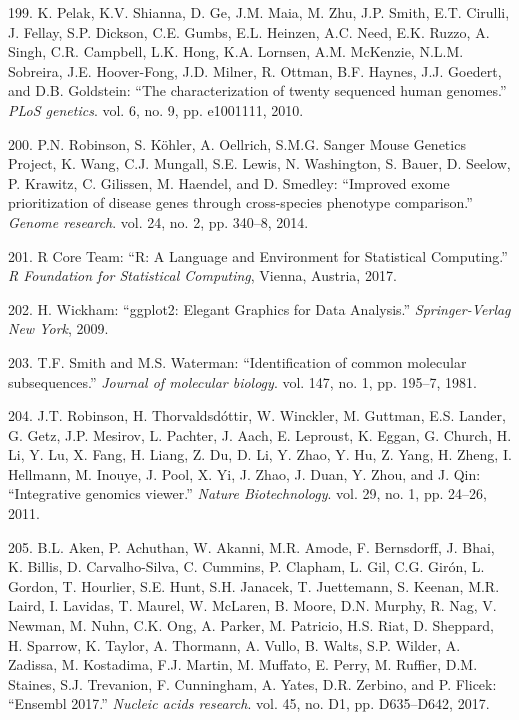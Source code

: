 \documentclass[12pt,a4paper,twoside]{ugathesis}
\theoremstyle{definition}
\theoremstyle{definition}
\theoremstyle{definition}
\theoremstyle{remark}
\begin{document}
\hypertarget{ref-Pelak2010}{}
199. K. Pelak, K.V. Shianna, D. Ge, J.M. Maia, M. Zhu, J.P. Smith, E.T.
Cirulli, J. Fellay, S.P. Dickson, C.E. Gumbs, E.L. Heinzen, A.C. Need,
E.K. Ruzzo, A. Singh, C.R. Campbell, L.K. Hong, K.A. Lornsen, A.M.
McKenzie, N.L.M. Sobreira, J.E. Hoover-Fong, J.D. Milner, R. Ottman,
B.F. Haynes, J.J. Goedert, and D.B. Goldstein: ``The characterization of
twenty sequenced human genomes.'' \emph{PLoS genetics}. vol. 6, no. 9,
pp. e1001111, 2010.

\hypertarget{ref-Robinson2014}{}
200. P.N. Robinson, S. Köhler, A. Oellrich, S.M.G. Sanger Mouse Genetics
Project, K. Wang, C.J. Mungall, S.E. Lewis, N. Washington, S. Bauer, D.
Seelow, P. Krawitz, C. Gilissen, M. Haendel, and D. Smedley: ``Improved
exome prioritization of disease genes through cross-species phenotype
comparison.'' \emph{Genome research}. vol. 24, no. 2, pp. 340--8, 2014.

\hypertarget{ref-RCoreTeam2017}{}
201. R Core Team: ``R: A Language and Environment for Statistical
Computing.'' \emph{R Foundation for Statistical Computing}, Vienna,
Austria, 2017.

\hypertarget{ref-Wickham2009}{}
202. H. Wickham: ``ggplot2: Elegant Graphics for Data Analysis.''
\emph{Springer-Verlag New York}, 2009.

\hypertarget{ref-Smith1981}{}
203. T.F. Smith and M.S. Waterman: ``Identification of common molecular
subsequences.'' \emph{Journal of molecular biology}. vol. 147, no. 1,
pp. 195--7, 1981.

\hypertarget{ref-Robinson2011}{}
204. J.T. Robinson, H. Thorvaldsdóttir, W. Winckler, M. Guttman, E.S.
Lander, G. Getz, J.P. Mesirov, L. Pachter, J. Aach, E. Leproust, K.
Eggan, G. Church, H. Li, Y. Lu, X. Fang, H. Liang, Z. Du, D. Li, Y.
Zhao, Y. Hu, Z. Yang, H. Zheng, I. Hellmann, M. Inouye, J. Pool, X. Yi,
J. Zhao, J. Duan, Y. Zhou, and J. Qin: ``Integrative genomics viewer.''
\emph{Nature Biotechnology}. vol. 29, no. 1, pp. 24--26, 2011.

\hypertarget{ref-Aken2017}{}
205. B.L. Aken, P. Achuthan, W. Akanni, M.R. Amode, F. Bernsdorff, J.
Bhai, K. Billis, D. Carvalho-Silva, C. Cummins, P. Clapham, L. Gil, C.G.
Girón, L. Gordon, T. Hourlier, S.E. Hunt, S.H. Janacek, T. Juettemann,
S. Keenan, M.R. Laird, I. Lavidas, T. Maurel, W. McLaren, B. Moore, D.N.
Murphy, R. Nag, V. Newman, M. Nuhn, C.K. Ong, A. Parker, M. Patricio,
H.S. Riat, D. Sheppard, H. Sparrow, K. Taylor, A. Thormann, A. Vullo, B.
Walts, S.P. Wilder, A. Zadissa, M. Kostadima, F.J. Martin, M. Muffato,
E. Perry, M. Ruffier, D.M. Staines, S.J. Trevanion, F. Cunningham, A.
Yates, D.R. Zerbino, and P. Flicek: ``Ensembl 2017.'' \emph{Nucleic
acids research}. vol. 45, no. D1, pp. D635--D642, 2017.
\end{document}
